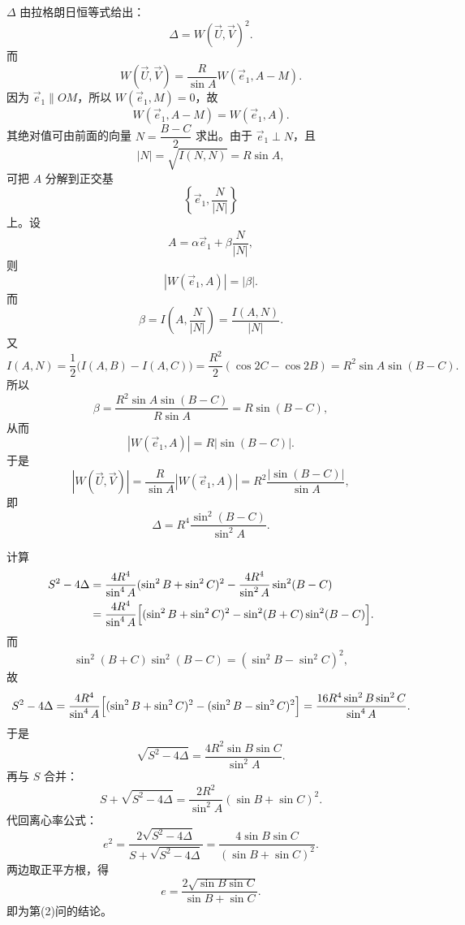 \begin{solution}
$\Delta$ 由拉格朗日恒等式给出：
\[
\Delta=W(\vec U,\vec V)^2.
\]
而
\[
W(\vec U,\vec V)=\frac{R}{\sin A}W(\vec e_1,A-M).
\]
因为 $\vec e_1\parallel OM$，所以 $W(\vec e_1,M)=0$，故
\[
W(\vec e_1,A-M)=W(\vec e_1,A).
\]
其绝对值可由前面的向量 $N=\dfrac{B-C}{2}$ 求出。由于 $\vec e_1\perp N$，且
\[
|N|=\sqrt{I(N,N)}=R\sin A,
\]
可把 $A$ 分解到正交基
\[
\left\{\vec e_1,\frac{N}{|N|}\right\}
\]
上。设
\[
A=\alpha\vec e_1+\beta\frac{N}{|N|},
\]
则
\[
|W(\vec e_1,A)|=|\beta|.
\]
而
\[
\beta=I\left(A,\frac{N}{|N|}\right)=\frac{I(A,N)}{|N|}.
\]
又
\[
I(A,N)=\frac12\bigl(I(A,B)-I(A,C)\bigr)
=\frac{R^2}{2}(\cos2C-\cos2B)
=R^2\sin A\sin(B-C).
\]
所以
\[
\beta=\frac{R^2\sin A\sin(B-C)}{R\sin A}=R\sin(B-C),
\]
从而
\[
|W(\vec e_1,A)|=R|\sin(B-C)|.
\]
于是
\[
|W(\vec U,\vec V)|=\frac{R}{\sin A}|W(\vec e_1,A)|=R^2\frac{|\sin(B-C)|}{\sin A},
\]
即
\[
\Delta=R^4\frac{\sin^2(B-C)}{\sin^2A}.
\]

计算
\begin{align*}
S^2-4\Delta
&=\frac{4R^4}{\sin^4A}(\sin^2B+\sin^2C)^2-\frac{4R^4}{\sin^2A}\sin^2(B-C)\\
&=\frac{4R^4}{\sin^4A}\Bigl[(\sin^2B+\sin^2C)^2-\sin^2(B+C)\sin^2(B-C)\Bigr].
\end{align*}
而
\[
\sin^2(B+C)\sin^2(B-C)=(\sin^2B-\sin^2C)^2,
\]
故
\[
S^2-4\Delta
=\frac{4R^4}{\sin^4A}\Bigl[(\sin^2B+\sin^2C)^2-(\sin^2B-\sin^2C)^2\Bigr]
=\frac{16R^4\sin^2B\sin^2C}{\sin^4A}.
\]
于是
\[
\sqrt{S^2-4\Delta}=\frac{4R^2\sin B\sin C}{\sin^2A}.
\]
再与 $S$ 合并：
\[
S+\sqrt{S^2-4\Delta}
=\frac{2R^2}{\sin^2A}(\sin B+\sin C)^2.
\]
代回离心率公式：
\[
e^2
=\frac{2\sqrt{S^2-4\Delta}}{S+\sqrt{S^2-4\Delta}}
=\frac{4\sin B\sin C}{(\sin B+\sin C)^2}.
\]
两边取正平方根，得
\[
e=\frac{2\sqrt{\sin B\sin C}}{\sin B+\sin C}.
\]
即为第(2)问的结论。
\end{solution}





